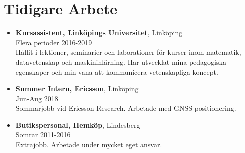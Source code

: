 \documentclass[12pt]{article}
\newcommand{\text}[2]{#2}
\newcommand{\text}[2]{#1}
\begin{document}
\section*{\text{Previous Work}{Tidigare Arbete}}
\begin{itemize}
    \item \textbf{\text{Teaching Assistant, Linköping University}{Kursassistent, Linköpings Universitet}}, Linköping\\
        \text{Multiple periods}{Flera perioder} 2016-2019\\
        \text{
            Held lessons, seminars and lab-sessions for courses in mathematics, computer science and machine learning. Developed my teaching skills and my ability to communicate scientific concepts.
        }{
            Hållit i lektioner, seminarier och laborationer för kurser inom matematik, datavetenskap och maskininlärning. Har utvecklat mina pedagogiska egenskaper och min vana att kommunicera vetenskapliga koncept.
        }
    \item \textbf{Summer Intern, Ericsson}, Linköping\\
        Jun-Aug 2018\\
        \text{
            Summer internship at Ericsson Research. Worked with GNSS positioning.
        }{
            Sommarjobb vid Ericsson Research. Arbetade med GNSS-positionering.
        }

        \newpage
    \item \textbf{\text{Store Clerk}{Butikspersonal}, Hemköp}, Lindesberg\\
        \text{Summers}{Somrar} 2011-2016\\
        \text{
            Extra job. Worked under a lot of individual responsibility.
        }{
            Extrajobb. Arbetade under mycket eget ansvar.
        }

\end{itemize}
\end{document}
